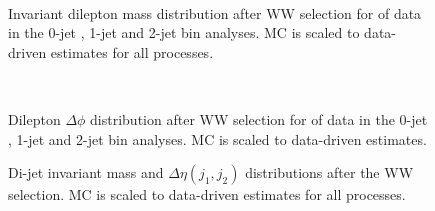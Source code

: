 \begin{figure}[!hbtp]
\centering
\subfigure[]{
\centering
\label{subfig:ww_dilmass_0j}
}
\subfigure[]{
\centering
\label{subfig:ww_dilmass_1j}
}
\subfigure[]{
\centering
\label{subfig:ww_dilmass_2j}
} \\
\caption{\fixme Invariant dilepton mass distribution after WW selection for \intlumiEightTeV of data in the 0-jet , 
1-jet  and 2-jet  bin analyses. 
MC is scaled to data-driven estimates for all processes.}
\label{fig:ww_dilmass}
\end{figure}

\begin{figure}[!hbtp]
\centering
\subfigure[]{
\centering
\label{subfig:ww_deltaphi_0j}
}
\subfigure[]{
\centering
\label{subfig:ww_deltaphi_1j}
}
\subfigure[]{
\centering
\label{subfig:ww_deltaphi_2j}
} \\
\caption{\fixme Dilepton $\Delta\phi$ distribution after WW selection for \intlumiEightTeV of data in the 0-jet , 
1-jet  and 2-jet  bin analyses. 
MC is scaled to data-driven estimates.}
\label{fig:ww_deltaphi}
\end{figure}

\begin{figure}[!hbtp]
\centering
\subfigure[]{
\centering
\label{subfig:ww_mjj_2j}
}
\subfigure[]{
\centering
\label{subfig:ww_detajj_2j}
}
\caption{\fixme Di-jet invariant mass  and $\Delta\eta(j_1, j_2)$  distributions after the 
WW selection. MC is scaled to data-driven estimates for all processes.}
\label{fig:ww_2j}
\end{figure}

